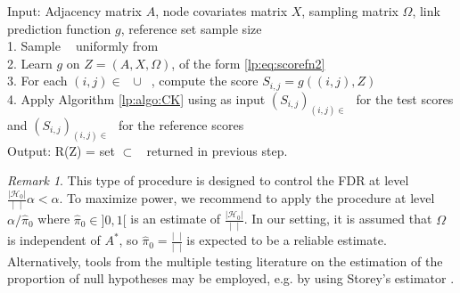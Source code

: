 \documentclass[a4paper, 11pt]{article}
\theoremstyle{remark}
\newtheorem{remark}{Remark}
\DeclareMathOperator{\Dtr}{\cD_{\text{train}}}
\DeclareMathOperator{\Dcal}{\cD_{\text{cal}}}
\DeclareMathOperator{\Dtest}{\cD_{\text{test}}}
\DeclareMathOperator{\DtrNull}{\cD^0_{\text{train}}}
\DeclareMathOperator{\DtrAlt}{\cD^1_{\text{train}}}
\newcommand{\EM}{\ensuremath}
\newcommand{\cD}{\EM{\mathcal{D}}}
\newcommand{\cH}{\EM{\mathcal{H}}}
\begin{document}
\begin{algorithm}[t]
Input: {Adjacency matrix $A$, node covariates matrix $X$, sampling matrix $\Omega$, link prediction function $g$, reference set sample size}\\
1. Sample $\Dcal$ uniformly from $\DtrNull$ \\
2. Learn $g$ on $Z=(A, X, \Omega)$, of the form \eqref{lp:eq:scorefn2} \\
3. For each $(i,j) \in \Dcal \cup \Dtest$, compute the score $S_{i,j} = g((i,j), Z)$ \\
4. Apply Algorithm \ref{lp:algo:CK} using as input $(S_{i,j})_{(i,j) \in \Dtest}$ for the test scores and $(S_{i,j})_{(i,j) \in \Dcal}$ for the reference scores \\
Output: { R(Z) = set $\subset \Dtest$ returned in previous step.} %
  \caption{Conformal link prediction}\label{lp:algo:main}
\end{algorithm}

\begin{remark} This type of procedure is designed to control the FDR at level $\frac{ \vert \cH_0 \vert} {\vert \Dtest \vert} \alpha < \alpha$. To maximize power, we recommend to apply the procedure at level $\alpha / \hat \pi_0$ where $\hat \pi_0 \in ]0,1[$ is an estimate of $\frac{ \vert \cH_0 \vert} {\vert \Dtest \vert}$. In our setting, it is assumed that $\Omega$ is independent of $A^*$, so $\hat \pi_0 = \frac{ \vert \DtrNull \vert} {\vert \Dtr\vert}$ is expected to be a reliable estimate. Alternatively, tools from the multiple testing literature on the estimation of the proportion of null hypotheses may be employed, e.g. by using Storey's estimator \citep{marandon22b}. 
\end{remark}
\end{document}
